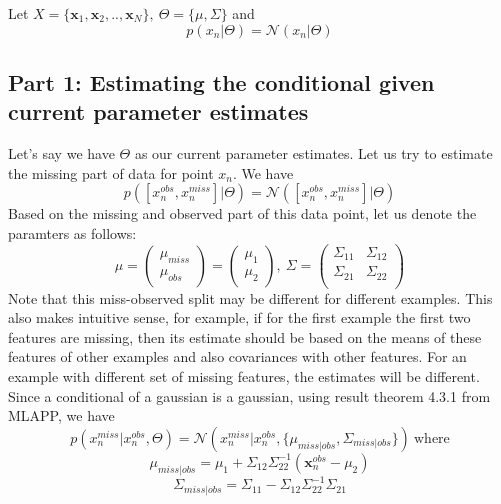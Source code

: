 \documentclass[a4paper,11pt]{article}
\begin{document}
\begin{mlsolution}
Let $X=\{\textbf{x}_1, \textbf{x}_2,..,\textbf{x}_N\}, \ \Theta=\{\mu, \Sigma\}$ and 
\[
p(x_n| \Theta) = \mathcal{N}(x_n| \Theta)
\]


\subsection{Part 1: Estimating the conditional given current parameter estimates}
\label{p3p1}
Let's say we have $\Theta$ as our current parameter estimates. Let us try to estimate the missing part of data for point $x_n$. We have
\[
p([x^{obs}_n, x^{miss}_n]| \Theta) = \mathcal{N}([x^{obs}_n, x^{miss}_n]| \Theta)
\]
Based on the missing and observed part of this data point, let us denote the paramters as follows:
\[
\mu = \begin{pmatrix}
\mu_{miss} \\ 
\mu_{obs} 
\end{pmatrix}
 = \begin{pmatrix}
 \mu_{1} \\ 
 \mu_{2} 
 \end{pmatrix}, \ 
\Sigma = \begin{pmatrix}
\Sigma_{11} & \Sigma_{12}\\
\Sigma_{21} & \Sigma_{22}\\
\end{pmatrix}
\]
Note that this miss-observed split may be different for different examples. This also makes intuitive sense, for example, if for the first example the first two features are missing, then its estimate should be based on the means of these features of other examples and also covariances with other features. For an example with different set of missing features, the estimates will be different.
Since a conditional of  a gaussian is a gaussian, using result theorem 4.3.1 from MLAPP, we have
\[
\boxed{p(x^{miss}_{n}| x^{obs}_{n}, \Theta) = \mathcal{N}(x^{miss}_n| x^{obs}_{n}, \{\mu_{miss|obs}, \Sigma_{miss|obs}\})} \ \text{where}
\]
\[
\mu_{miss|obs} = \mu_{1} + \Sigma_{12}\Sigma^{-1}_{22}(\textbf{x}^{obs}_n-\mu_{2})
\]
\[
\Sigma_{miss|obs} = \Sigma_{11}-\Sigma_{12}\Sigma^{-1}_{22}\Sigma_{21}
\]


\end{mlsolution}
\end{document}

